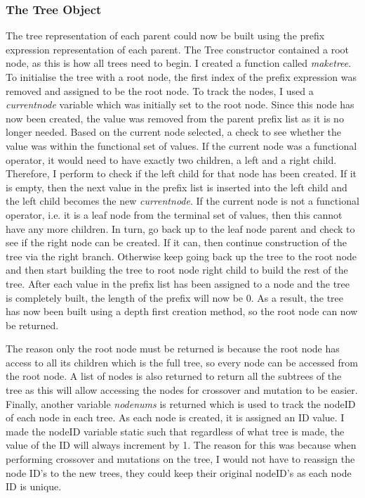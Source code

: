 \documentclass[11pt]{article}
\begin{document}
\subsubsection{The Tree Object}
The tree representation of each parent could now be built using the prefix expression representation of each parent. The Tree constructor contained a root node, as this is how all trees need to begin. I created a function called \textit{make\textunderscore tree}. To initialise the tree with a root node, the first index of the prefix expression was removed and assigned to be the root node. To track the nodes, I used a \textit{current\textunderscore node} variable which was initially set to the root node. Since this node has now been created, the value was removed from the parent prefix list as it is no longer needed. Based on the current node selected, a check to see whether the value was within the functional set of values. If the current node was a functional operator,  it would need to have exactly two children, a left and a right child. Therefore, I perform to check if the left child for that node has been created. If it is empty, then the next value in the prefix list is inserted into the left child and the left child becomes the new \textit{current\textunderscore node}. If the current node is not a functional operator, i.e. it is a leaf node from the terminal set of values, then this cannot have any more children. In turn, go back up to the leaf node parent and check to see if the right node can be created. If it can, then continue construction of the tree via the right branch. Otherwise keep going back up the tree to the root node and then start building the tree to root node right child to build the rest of the tree. After each value in the prefix list has been assigned to a node and the tree is completely built, the length of the prefix will now be 0. As a result, the tree has now been built using a depth first creation method, so the root node can now be returned. 

The reason only the root node must be returned is because the root node has access to all its children which is the full tree, so every node can be accessed from the root node. A list of nodes is also returned to return all the subtrees of the tree as this will allow accessing the nodes for crossover and mutation to be easier. Finally, another variable \textit{nodenums} is returned which is used to track the nodeID of each node in each tree. As each node is created, it is assigned an ID value. I made the nodeID variable static such that regardless of what tree is made, the value of the ID will always increment by 1. The reason for this was because when performing crossover and mutations on the tree, I would not have to reassign the node ID's to the new trees, they could keep their original nodeID's as each node ID is unique.
\end{document}
